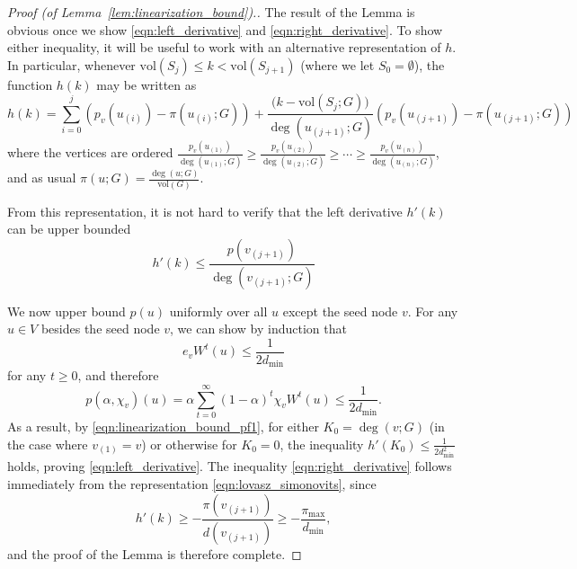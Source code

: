 \documentclass[11pt,twoside]{article}
\theoremstyle{definition}
\newcommand{\vol}{\mathrm{vol}}
\newcommand{\1}{\mathbbm{1}}
\begin{document}
\begin{proof}[Proof (of Lemma~\ref{lem:linearization_bound}).]
	The result of the Lemma is obvious once we show \eqref{eqn:left_derivative} and \eqref{eqn:right_derivative}. To show either inequality, it will be useful to work with an alternative representation of $h$. In particular,  whenever $\vol(S_j) \leq k < \vol(S_{j + 1})$ (where we let $S_0 = \emptyset$), the function $h(k)$ may be written as
	\begin{equation}
	\label{eqn:lovasz_simonovits}
	h(k) = \sum_{i = 0}^{j} \left(p_v(u_{(i)}) - \pi(u_{(i)};G)\right) + \frac{\bigl(k - \vol(S_j;G)\bigr)}{\deg(u_{(j + 1)};G)} \left(p_v(u_{(j+1)}) - \pi(u_{(j+1)};G)\right) 
	\end{equation}
	where the vertices are ordered $\frac{p_v(u_{(1)})}{\deg(u_{(1)};G)} \geq \frac{p_v(u_{(2)})}{\deg(u_{(2)};G)} \geq \cdots \geq \frac{p_v(u_{(n)})}{\deg(u_{(n)};G)}$, and as usual $\pi(u;G) = \frac{\deg(u;G)}{\vol(G)}$. 
	
	From this representation, it is not hard to verify that the left derivative $h'(k)$ can be upper bounded
	\begin{equation}
	\label{eqn:linearization_bound_pf1}
	h'(k) \leq \frac{p(v_{(j + 1)})}{\deg(v_{(j + 1)};G)}
	\end{equation}
	
	We now upper bound $p(u)$ uniformly over all $u$ except the seed node $v$. For any $u \in V$ besides the seed node $v$, we can show by induction that
	\begin{equation*}
	e_v W^t(u) \leq \frac{1}{2 d_{\min}}
	\end{equation*} 
	for any $t \geq 0$, and therefore
	\begin{equation}
	\label{eqn:linearization_bound_pf2}
	p(\alpha,\chi_v)(u) = \alpha \sum_{t = 0}^{\infty} (1 - \alpha)^t \chi_v W^t(u) \leq  \frac{1}{2d_{\min}}.
	\end{equation}
	As a result, by \eqref{eqn:linearization_bound_pf1}, for either $K_0 = \deg(v;G)$ (in the case where $v_{(1)} = v$) or otherwise for $K_0 = 0$, the inequality $h'(K_0) \leq \frac{1}{2d_{\min}^2}$ holds, proving \eqref{eqn:left_derivative}. The inequality \eqref{eqn:right_derivative} follows immediately from the representation \eqref{eqn:lovasz_simonovits}, since
	\begin{equation*}
	h'(k) \geq -\frac{\pi(v_{(j+1)})}{d(v_{(j + 1)})} \geq -\frac{\pi_{\max}}{d_{\min}},
	\end{equation*}
	and the proof of the Lemma is therefore complete.
\end{proof}
\end{document}
